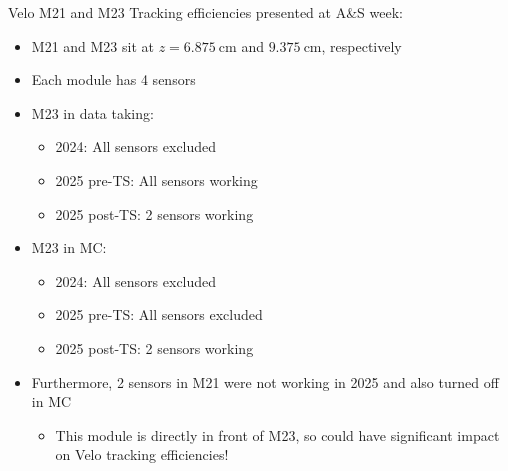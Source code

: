 \documentclass[xcolor={dvipsnames}]{beamer}
\begin{document}
\begin{frame}{Velo M21 and M23}
  \vspace{0.0cm}
  {\Large Tracking efficiencies presented at A\&S week:}
  \vspace{0.2cm}
  \begin{itemize}
    \setlength\itemsep{0.5em}
    \item{M21 and M23 sit at $z = \SI{6.875}{\centi\meter}$ and $\SI{9.375}{\centi\meter}$, respectively}
    \item{Each module has 4 sensors}
    \item{M23 in data taking:}
    \begin{itemize}
      \item[-]{2024: All sensors excluded}
      \item[-]{2025 pre-TS: All sensors working}
      \item[-]{2025 post-TS: 2 sensors working}
    \end{itemize}
    \item{M23 in MC:}
    \begin{itemize}
      \item[-]{2024: All sensors excluded}
      \item[-]{2025 pre-TS: All sensors excluded}
      \item[-]{2025 post-TS: 2 sensors working}
    \end{itemize}
    \item{Furthermore, 2 sensors in M21 were not working in 2025 and also turned off in MC}
    \begin{itemize}
      \item[-]{This module is directly in front of M23, so could have significant impact on Velo tracking efficiencies!}
    \end{itemize}
  \end{itemize}
\end{frame}
\end{document}
